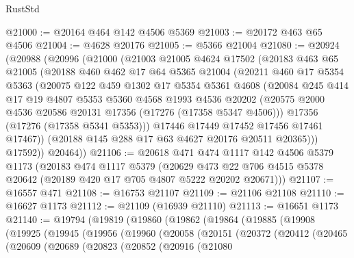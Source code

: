 \begin{lexlean}{RustStd}
\begin{coremodule}
@21000 := @20164 @464 @142 @4506 @5369
@21003 := @20172 @463 @65 @4506
@21004 := @4628 @20176
@21005 := @5366 @21004
@21080 := @20924
    (@20988
      (@20996
        (@21000
          (@21003
            @21005
            @4624
            @17502
            (@20183
              @463
              @65
              @21005
              (@20188
                @460
                @462
                @17
                @64
                @5365
                @21004
                (@20211
                  @460
                  @17
                  @5354
                  @5363
                  (@20075
                    @122
                    @459
                    @1302
                    @17
                    @5354
                    @5361
                    @4608
                    (@20084
                      @245
                      @414
                      @17
                      @19
                      @4807
                      @5353
                      @5360
                      @4568
                      @1993
                      @4536
                      @20202
                      (@20575 @2000 @4536 @20586 @20131 @17356 (@17276 (@17358 @5347 @4506)))
                      @17356
                      (@17276 (@17358 @5341 @5353)))
                    @17446
                    @17449
                    @17452
                    @17456
                    @17461
                    @17467))
                (@20188 @145 @288 @17 @63 @4627 @20176 @20511 @20365)))
            @17592))
        @20464))
@21106 := @20618
    @471
    @474
    @1117
    @142
    @4506
    @5379
    @1173
    (@20183
      @474
      @1117
      @5379
      (@20629 @473 @22 @706 @4515 @5378 @20642 (@20189 @420 @17 @705 @4807 @5222 @20202 @20671)))
@21107 := @16557 @471
@21108 := @16753 @21107
@21109 := @21106 @21108
@21110 := @16627 @1173
@21112 := @21109 (@16939 @21110)
@21113 := @16651 @1173
@21140 := @19794
    (@19819
      (@19860
        (@19862
          (@19864
            (@19885
              (@19908
                (@19925
                  (@19945
                    (@19956
                      (@19960
                        (@20058
                          (@20151
                            (@20372
                              (@20412
                                (@20465
                                  (@20609
                                    (@20689
                                      (@20823
                                        (@20852
                                          (@20916
                                            (@21080

\end{coremodule}
\end{lexlean}
